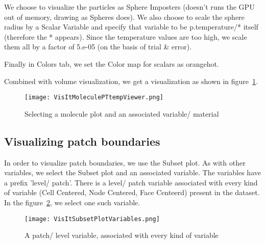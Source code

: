 We choose to visualize the particles as Sphere Imposters (doesn't runs the GPU out of memory, drawing as Spheres does). We also choose to scale the sphere radius by a Scalar Variable and specify that variable to be p.temperature/* itself (therefore the * appears). Since the temperature values are too high, we scale them all by a factor of 5.e-05 (on the basis of trial \& error).

Finally in Colors tab, we set the Color map for scalars as orangehot.

Combined with volume visualization, we get a visualization as shown in figure~\ref{VisItMoleculePTtempViewer}.

\begin{figure}
  \center
  \texttt{[image: VisItMoleculePTtempViewer.png]}
  \caption{Selecting a molecule plot and an associated variable/ material}
  \label{VisItMoleculePTtempViewer}
\end{figure}

\subsection{Visualizing patch boundaries}
In order to visualize patch boundaries, we use the Subset plot. As with other variables, we select the Subset plot and an associated variable. The variables have a prefix 'level/ patch'. There is a level/ patch variable associated with every kind of variable (Cell Centered, Node Centered, Face Centeerd) present in the dataset. In the figure~\ref{VisItSubsetPlotVariables}, we select one such variable.


\begin{figure}
  \center
  \texttt{[image: VisItSubsetPlotVariables.png]}
  \caption{A patch/ level variable, associated with every kind of variable}
  \label{VisItSubsetPlotVariables}
\end{figure}

